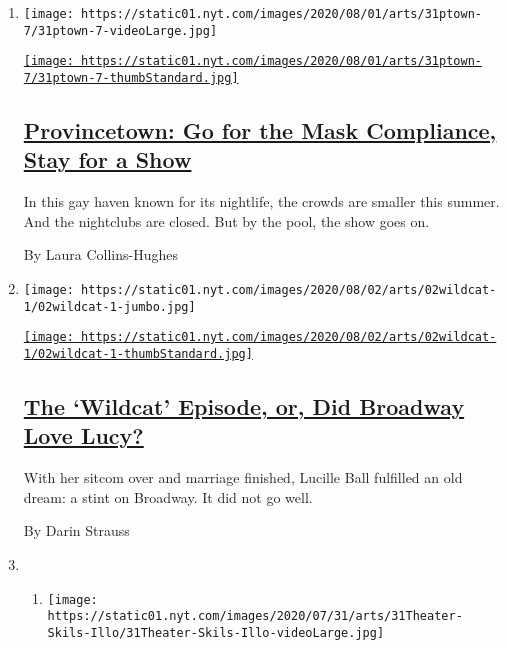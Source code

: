 \begin{enumerate}
\def\labelenumi{\arabic{enumi}.}
\item
  \texttt{[image: https://static01.nyt.com/images/2020/08/01/arts/31ptown-7/31ptown-7-videoLarge.jpg]}

  \href{/2020/07/31/theater/provincetown-nightlife-coronavirus.html}{\texttt{[image: https://static01.nyt.com/images/2020/08/01/arts/31ptown-7/31ptown-7-thumbStandard.jpg]}}

  \hypertarget{provincetown-go-for-the-mask-compliance-stay-for-a-show}{%
  \subsection{\texorpdfstring{\href{/2020/07/31/theater/provincetown-nightlife-coronavirus.html}{Provincetown:
  Go for the Mask Compliance, Stay for a
  Show}}{Provincetown: Go for the Mask Compliance, Stay for a Show}}\label{provincetown-go-for-the-mask-compliance-stay-for-a-show}}

  In this gay haven known for its nightlife, the crowds are smaller this
  summer. And the nightclubs are closed. But by the pool, the show goes
  on.

  By Laura Collins-Hughes
\item
  \texttt{[image: https://static01.nyt.com/images/2020/08/02/arts/02wildcat-1/02wildcat-1-jumbo.jpg]}

  \href{/2020/07/31/theater/lucille-ball-wildcat.html}{\texttt{[image: https://static01.nyt.com/images/2020/08/02/arts/02wildcat-1/02wildcat-1-thumbStandard.jpg]}}

  \hypertarget{the-wildcat-episode-or-did-broadway-love-lucy}{%
  \subsection{\texorpdfstring{\href{/2020/07/31/theater/lucille-ball-wildcat.html}{The
  `Wildcat' Episode, or, Did Broadway Love
  Lucy?}}{The `Wildcat' Episode, or, Did Broadway Love Lucy?}}\label{the-wildcat-episode-or-did-broadway-love-lucy}}

  With her sitcom over and marriage finished, Lucille Ball fulfilled an
  old dream: a stint on Broadway. It did not go well.

  By Darin Strauss
\item
  \begin{enumerate}
  \def\labelenumii{\arabic{enumii}.}
  \item
    \texttt{[image: https://static01.nyt.com/images/2020/07/31/arts/31Theater-Skils-Illo/31Theater-Skils-Illo-videoLarge.jpg]}


\end{enumerate}
\end{enumerate}
